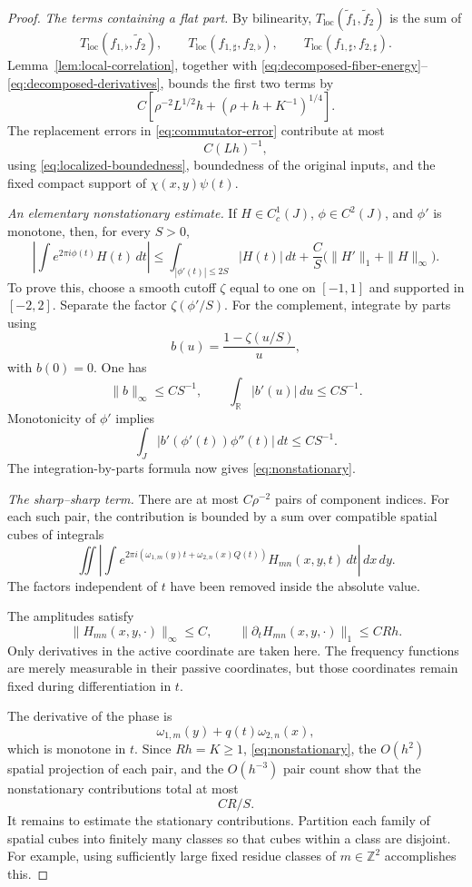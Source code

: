 \documentclass[11pt,a4paper]{article}
\newcommand{\R}{\mathbb R}
\newcommand{\Z}{\mathbb Z}
\begin{document}
\begin{proof}
\medskip
\noindent\textit{The terms containing a flat part.}
By bilinearity, $T_{\mathrm{loc}}(\widetilde f_1,\widetilde f_2)$ is the sum
of
\[
T_{\mathrm{loc}}(f_{1,\flat},\widetilde f_2),\qquad
T_{\mathrm{loc}}(f_{1,\sharp},f_{2,\flat}),\qquad
T_{\mathrm{loc}}(f_{1,\sharp},f_{2,\sharp}).
\]
Lemma~\ref{lem:local-correlation}, together with
\eqref{eq:decomposed-fiber-energy}--\eqref{eq:decomposed-derivatives},
bounds the first two terms by
\[
C\left[\rho^{-2}L^{1/2}h+(\rho+h+K^{-1})^{1/4}\right].
\tag{6.9}\label{eq:flat-terms}
\]
The replacement errors in \eqref{eq:commutator-error} contribute at most
\[
C(Lh)^{-1},
\tag{6.10}\label{eq:operator-localization-error}
\]
using \eqref{eq:localized-boundedness}, boundedness of the original inputs,
and the fixed compact support of $\chi(x,y)\psi(t)$.

\medskip
\noindent\textit{An elementary nonstationary estimate.}
If $H\in C_c^1(J)$, $\phi\in C^2(J)$, and $\phi'$ is monotone, then, for
every $S>0$,
\[
\left|\int e^{2\pi i\phi(t)}H(t)\,dt\right|
\leq\int_{|\phi'(t)|\leq2S}|H(t)|\,dt
+\frac{C}{S}\bigl(\|H'\|_1+\|H\|_\infty\bigr).
\tag{6.11}\label{eq:nonstationary}
\]
To prove this, choose a smooth cutoff $\zeta$ equal to one on $[-1,1]$
and supported in $[-2,2]$. Separate the factor $\zeta(\phi'/S)$. For the
complement, integrate by parts using
\[
b(u)=\frac{1-\zeta(u/S)}{u},
\]
with $b(0)=0$. One has
\[
\|b\|_\infty\leq CS^{-1},\qquad
\int_{\R}|b'(u)|\,du\leq CS^{-1}.
\]
Monotonicity of $\phi'$ implies
\[
\int_J|b'(\phi'(t))\phi''(t)|\,dt\leq CS^{-1}.
\]
The integration-by-parts formula now gives \eqref{eq:nonstationary}.

\medskip
\noindent\textit{The sharp--sharp term.}
There are at most $C\rho^{-2}$ pairs of component indices. For each such
pair, the contribution is bounded by a sum over compatible spatial cubes
of integrals
\[
\iint\left|\int
 e^{2\pi i(\omega_{1,m}(y)t+\omega_{2,n}(x)Q(t))}
 H_{mn}(x,y,t)\,dt\right|\,dx\,dy.
\tag{6.12}\label{eq:sharp-oscillatory}
\]
The factors independent of $t$ have been removed inside the absolute value.

The amplitudes satisfy
\[
\|H_{mn}(x,y,\cdot)\|_\infty\leq C,\qquad
\|\partial_tH_{mn}(x,y,\cdot)\|_1\leq CRh.
\tag{6.13}\label{eq:sharp-amplitude}
\]
Only derivatives in the active coordinate are taken here. The frequency
functions are merely measurable in their passive coordinates, but those
coordinates remain fixed during differentiation in $t$.

The derivative of the phase is
\[
\omega_{1,m}(y)+q(t)\omega_{2,n}(x),
\]
which is monotone in $t$. Since $Rh=K\geq1$, \eqref{eq:nonstationary}, the
$O(h^2)$ spatial projection of each pair, and the $O(h^{-3})$ pair count
show that the nonstationary contributions total at most
\[
CR/S.
\tag{6.14}\label{eq:sharp-nonstationary}
\]
It remains to estimate the stationary contributions. Partition each
family of spatial cubes into finitely many classes so that cubes within
a class are disjoint. For example, using sufficiently large fixed residue
classes of $m\in\Z^2$ accomplishes this.


\end{proof}
\end{document}
